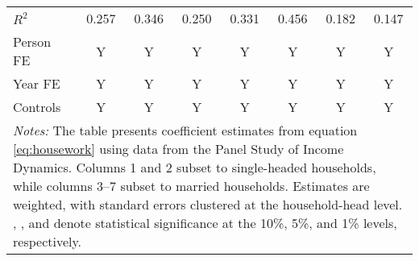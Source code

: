 {\begin{tabular}{l*{7}{c}}
\(R^{2}\)           &       0.257         &       0.346         &       0.250         &       0.331         &       0.456         &       0.182         &       0.147         \\
Person FE           &           Y         &           Y         &           Y         &           Y         &           Y         &           Y         &           Y         \\
Year FE             &           Y         &           Y         &           Y         &           Y         &           Y         &           Y         &           Y         \\
Controls            &           Y         &           Y         &           Y         &           Y         &           Y         &           Y         &           Y         \\
\bottomrule
\multicolumn{8}{p{16cm}}{\footnotesize \textit{Notes:} The table presents coefficient estimates from equation \ref{eq:housework} using data from the Panel Study of Income Dynamics. Columns 1 and 2 subset to single-headed households, while columns 3--7 subset to married households. Estimates are weighted, with standard errors clustered at the household-head level. \sym{*}, \sym{**}, and \sym{***} denote statistical significance at the 10\%, 5\%, and 1\% levels, respectively.}\\
\end{tabular}
}
